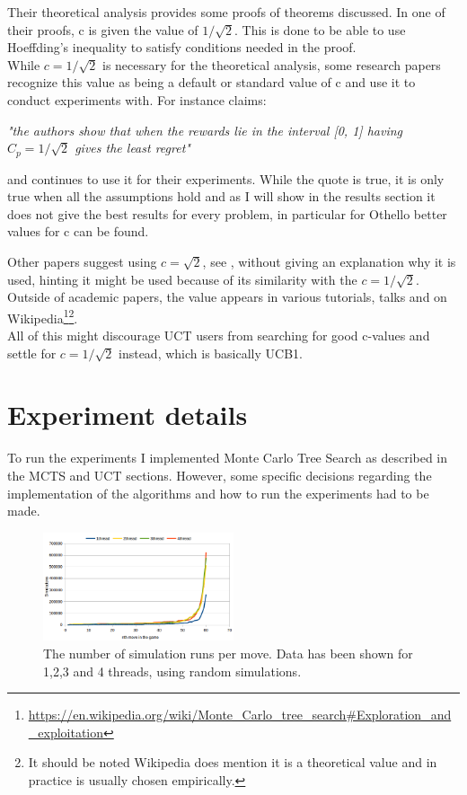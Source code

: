 \documentclass[
11pt, %
english, %
singlespacing, %
headsepline, %
]{MastersDoctoralThesis} %
\begin{document}
Their theoretical analysis provides some proofs of theorems discussed. In one of their proofs, c is given the value of $1/\sqrt{2}$. This is done to be able to use Hoeffding's inequality to satisfy conditions needed in the proof.\\

While $c = 1/\sqrt{2}$ is necessary for the theoretical analysis, some research papers recognize this value as being a default or standard value of c and use it to conduct experiments with. For instance \cite{finnsson2011game} claims:
\begin{displayquote}
\textit{"the authors show that when the rewards lie in the interval [0, 1] having $C_p = 1/\sqrt{2}$ gives the least regret"}
\end{displayquote}

and continues to use it for their experiments. While the quote is true, it is only true when all the assumptions hold and as I will show in the results section it does not give the best results for every problem, in particular for Othello better values for c can be found.

Other papers suggest using $c = \sqrt{2}$, see \cite{de2016monte}, without giving an explanation why it is used, hinting it might be used because of its similarity with the $c = 1/\sqrt{2}$. Outside of academic papers, the value appears in various tutorials, talks and on Wikipedia\footnote{\url{https://en.wikipedia.org/wiki/Monte_Carlo_tree_search\#Exploration_and_exploitation}}\footnote{It should be noted Wikipedia does mention it is a theoretical value and in practice is usually chosen empirically.}.\\

All of this might discourage UCT users from searching for good c-values and settle for $c = 1/\sqrt{2}$ instead, which is basically UCB1.


\chapter{Experiment details}
To run the experiments I implemented Monte Carlo Tree Search as described in the MCTS and UCT sections. However, some specific decisions regarding the implementation of the algorithms and how to run the experiments had to be made.

\begin{figure}[h]
	\centering
	\includegraphics[width=0.5\textwidth]{images/mcts-simulations-threads}
	\caption{The number of simulation runs per move. Data has been shown for 1,2,3 and 4 threads, using random simulations.}
	\label{fig:mcts-threads}
\end{figure}
\end{document}
